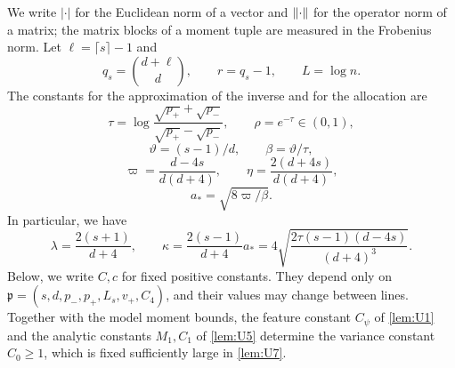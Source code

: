 We write $|\cdot|$ for the Euclidean norm of a vector and
$\lVert\cdot\rVert$ for the operator norm of a matrix; the matrix blocks of a
moment tuple are measured in the Frobenius norm. Let
$\ell=\lceil s\rceil-1$ and
\begin{equation}\label{eq:U-setup-dims}
 q_s=\binom{d+\ell}{d},\qquad r=q_s-1,\qquad L=\log n.
\end{equation}
The constants for the approximation of the inverse and for the
allocation are
\begin{equation}\label{eq:U-setup-rho}
 \tau=\log\frac{\sqrt{p_+}+\sqrt{p_-}}{\sqrt{p_+}-\sqrt{p_-}},
 \qquad \rho=e^{-\tau}\in(0,1),
\end{equation}
\[
 \vartheta=(s-1)/d,\qquad \beta=\vartheta/\tau,
\]
\begin{equation}\label{eq:U-setup-exponents}
 \varpi=\frac{d-4s}{d(d+4)},\qquad
 \eta=\frac{2(d+4s)}{d(d+4)},
\end{equation}
\begin{equation}\label{eq:U-setup-allocation}
 a_*=\sqrt{8\varpi/\beta}.
\end{equation}
In particular, we have
\begin{equation}\label{eq:U-setup-rate}
 \lambda=\frac{2(s+1)}{d+4},\qquad
 \kappa=\frac{2(s-1)}{d+4}a_*
 =4\sqrt{\frac{2\tau(s-1)(d-4s)}{(d+4)^3}}.
\end{equation}
Below, we write $C,c$ for fixed positive constants. They depend only on
$\mathfrak p=(s,d,p_-,p_+,L_s,v_+,C_4)$, and their values may change
between lines. Together with the model moment bounds, the feature constant $C_\psi$
of \cref{lem:U1} and the analytic constants $M_1,C_1$ of \cref{lem:U5}
determine the variance constant
$C_0\ge1$, which is fixed sufficiently large in \cref{lem:U7}.

